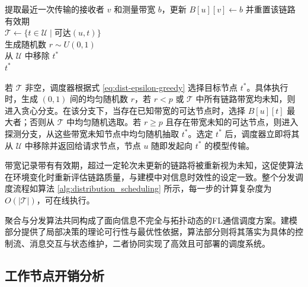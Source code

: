 \documentclass[master, vlined]{DissertUESTC}
\begin{document}
	\begin{algorithm}[!hbt]
		\caption{即时贪心探测算法}
		\label{alg:distribution_scheduling}
		\BlankLine
		提取最近一次传输的接收者 $v$ 和测量带宽 $b$，更新 $B[u][v]\gets b$ 并重置该链路有效期 \\
		$\mathcal{T}\gets \{t\in\mathcal{U}\mid\text{可达}(u,t)\}$ \\
		生成随机数 $r\sim U(0,1)$ \\
		从 $\mathcal{U}$ 中移除 $t^*$ \\
		\Return $t^*$ \\
	\end{algorithm}

	若 $\mathcal{T}$ 非空，调度器根据式 \eqref{eq:dist-epsilon-greedy} 选择目标节点 $t^*$。具体执行时，生成 $(0,1)$ 间的均匀随机数 $r$，若 $r<p$ 或 $\mathcal{T}$ 中所有链路带宽均未知，则进入贪心分支。在该分支下，当存在已知带宽的可达节点时，选择 $B[u][t]$ 最大者；否则从 $\mathcal{T}$ 中均匀随机选取。若 $r\ge p$ 且存在带宽未知的可达节点，则进入探测分支，从这些带宽未知节点中均匀随机抽取 $t^*$。选定 $t^*$ 后，调度器立即将其从 $\mathcal{U}$ 中移除并返回给请求节点，节点 $u$ 随即发起向 $t^*$ 的模型传输。

	带宽记录带有有效期，超过一定轮次未更新的链路将被重新视为未知，这促使算法在环境变化时重新评估链路质量，与建模中对信息时效性的设定一致。整个分发调度流程如算法 \ref{alg:distribution_scheduling} 所示，每一步的计算复杂度为 $O(|\mathcal{T}|)$，可在线执行。

	聚合与分发算法共同构成了面向信息不完全与拓扑动态的FL通信调度方案。建模部分提供了局部决策的理论可行性与最优性依据，算法部分则将其落实为具体的控制流、消息交互与状态维护，二者协同实现了高效且可部署的调度系统。

	\subsection{工作节点开销分析}
\end{document}
